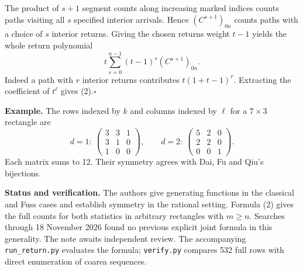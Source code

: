 \documentclass[11pt]{article}
\newcommand{\done}{\hfill\(\square\)}
\begin{document}
The product of $s+1$ segment counts along increasing marked indices counts paths visiting all $s$ specified interior arrivals. Hence $(C^{s+1})_{0n}$ counts paths with a choice of $s$ interior returns. Giving the chosen returns weight $t-1$ yields the whole return polynomial
\[
 t\sum_{s=0}^{n-1}(t-1)^s(C^{s+1})_{0n}.
\]
Indeed a path with $r$ interior returns contributes $t(1+t-1)^r$. Extracting the coefficient of $t^\ell$ gives (2).\done

\textbf{Example.} The rows indexed by $k$ and columns indexed by $\ell$ for a $7\times3$ rectangle are
\[
 d=1:\ \begin{pmatrix}3&3&1\\3&1&0\\1&0&0\end{pmatrix},\qquad
 d=2:\ \begin{pmatrix}5&2&0\\2&2&0\\0&0&1\end{pmatrix}.
\]
Each matrix sums to 12. Their symmetry agrees with Dai, Fu and Qiu's bijections.

\small
\textbf{Status and verification.} The authors give generating functions in the classical and Fuss cases and establish symmetry in the rational setting. Formula (2) gives the full counts for both statistics in arbitrary rectangles with $m\ge n$. Searches through 18 November 2026 found no previous explicit joint formula in this generality. The note awaits independent review. The accompanying \texttt{run\_return.py} evaluates the formula; \texttt{verify.py} compares 532 full rows with direct enumeration of coarea sequences.
\end{document}
